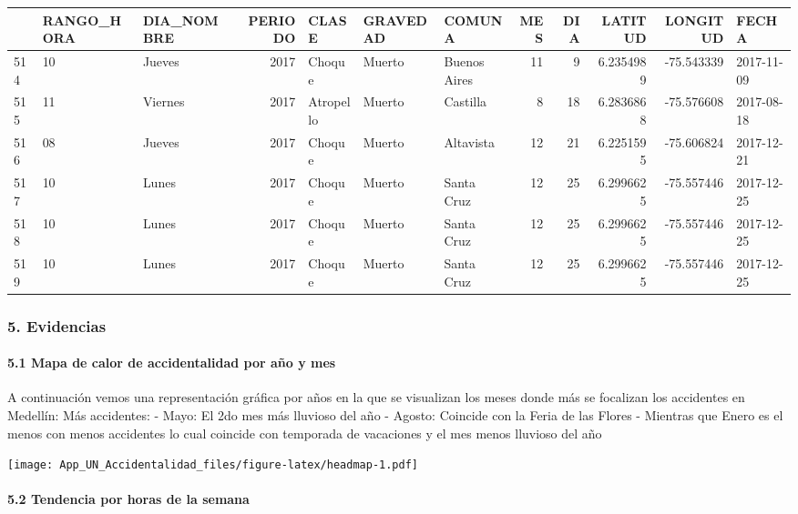 \documentclass[]{article}
\let\oldparagraph\paragraph
\renewcommand{\paragraph}[1]{\oldparagraph{#1}\mbox{}}
\begin{document}
\begin{tabular}{l|l|l|r|l|l|l|r|r|r|r|l}
\hline
  & RANGO\_HORA & DIA\_NOMBRE & PERIODO & CLASE & GRAVEDAD & COMUNA & MES & DIA & LATITUD & LONGITUD & FECHA\\
\hline
514 & 10 & Jueves & 2017 & Choque & Muerto & Buenos Aires & 11 & 9 & 6.2354989 & -75.543339 & 2017-11-09\\
\hline
515 & 11 & Viernes & 2017 & Atropello & Muerto & Castilla & 8 & 18 & 6.2836868 & -75.576608 & 2017-08-18\\
\hline
516 & 08 & Jueves & 2017 & Choque & Muerto & Altavista & 12 & 21 & 6.2251595 & -75.606824 & 2017-12-21\\
\hline
517 & 10 & Lunes & 2017 & Choque & Muerto & Santa Cruz & 12 & 25 & 6.2996625 & -75.557446 & 2017-12-25\\
\hline
518 & 10 & Lunes & 2017 & Choque & Muerto & Santa Cruz & 12 & 25 & 6.2996625 & -75.557446 & 2017-12-25\\
\hline
519 & 10 & Lunes & 2017 & Choque & Muerto & Santa Cruz & 12 & 25 & 6.2996625 & -75.557446 & 2017-12-25\\
\hline
\end{tabular}
\endgroup{}

\hypertarget{evidencias}{%
\subsubsection{5. Evidencias}\label{evidencias}}

\hypertarget{mapa-de-calor-de-accidentalidad-por-ano-y-mes}{%
\paragraph{5.1 Mapa de calor de accidentalidad por año y
mes}\label{mapa-de-calor-de-accidentalidad-por-ano-y-mes}}

A continuación vemos una representación gráfica por años en la que se
visualizan los meses donde más se focalizan los accidentes en Medellín:
Más accidentes: - Mayo: El 2do mes más lluvioso del año - Agosto:
Coincide con la Feria de las Flores - Mientras que Enero es el menos con
menos accidentes lo cual coincide con temporada de vacaciones y el mes
menos lluvioso del año

\texttt{[image: App\_UN\_Accidentalidad\_files/figure-latex/headmap-1.pdf]}

\hypertarget{tendencia-por-horas-de-la-semana}{%
\paragraph{5.2 Tendencia por horas de la
semana}\label{tendencia-por-horas-de-la-semana}}
\end{document}
